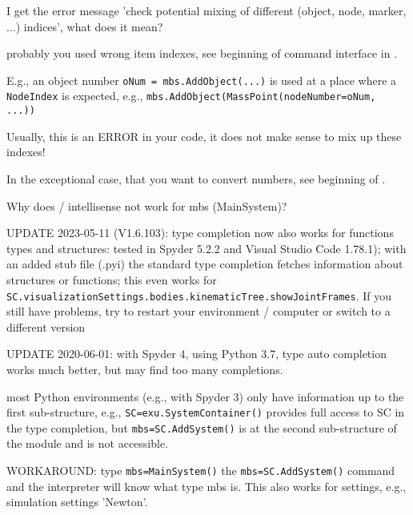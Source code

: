 \item I get the error message 'check potential mixing of different (object, node, marker, ...) indices', what does it mean?
\bi
\item[$\ra$] probably you used wrong item indexes, see beginning of command interface in . 
\item[$\ra$] E.g., an object number \texttt{oNum = mbs.AddObject(...)} is used at a place where a \texttt{NodeIndex} is expected, e.g., \texttt{mbs.AddObject(MassPoint(nodeNumber=oNum, ...))}
\item[$\ra$] Usually, this is an ERROR in your code, it does not make sense to mix up these indexes!
\item[$\ra$] In the exceptional case, that you want to convert numbers, see beginning of .
\ei
\item Why does  / intellisense not work for mbs (MainSystem)?
\bi
\item[$\ra$] UPDATE 2023-05-11 (V1.6.103): type completion now also works for functions\, types and structures: tested in Spyder 5.2.2 and Visual Studio Code 1.78.1); with an added stub file (.pyi) the standard type completion fetches information about structures or functions; this even works for \texttt{SC.visualizationSettings.bodies.kinematicTree.showJointFrames}. If you still have problems, try to restart your environment / computer or switch to a different version
\item[$\ra$] UPDATE 2020-06-01: with Spyder 4, using Python 3.7, type auto completion works much better, but may find too many completions.
\item[$\ra$] most Python environments (e.g., with Spyder 3) only have information up to the first sub-structure, e.g., \texttt{SC=exu.SystemContainer()} provides full access to SC in the type completion, but \texttt{mbs=SC.AddSystem()} is at the second sub-structure of the module and is not accessible.
\item[$\ra$] WORKAROUND: type \texttt{mbs=MainSystem()}  the \texttt{mbs=SC.AddSystem()} command and the interpreter will know what type mbs is. This also works for settings, e.g., simulation settings 'Newton'.

